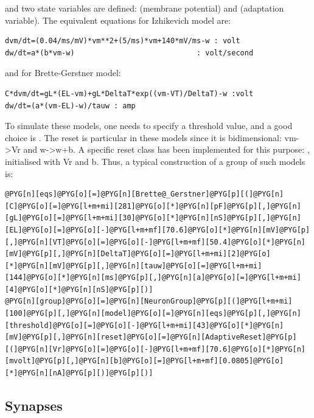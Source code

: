 \documentclass[letterpaper,10pt,english]{manual}
\begin{document}
and two state variables are defined:  (membrane potential) and  (adaptation variable).
The equivalent equations for Izhikevich model are:

\begin{Verbatim}[commandchars=@\[\]]
dvm/dt=(0.04/ms/mV)*vm**2+(5/ms)*vm+140*mV/ms-w : volt
dw/dt=a*(b*vm-w)                            : volt/second
\end{Verbatim}

and for Brette-Gerstner model:

\begin{Verbatim}[commandchars=@\[\]]
C*dvm/dt=gL*(EL-vm)+gL*DeltaT*exp((vm-VT)/DeltaT)-w :volt
dw/dt=(a*(vm-EL)-w)/tauw : amp
\end{Verbatim}

To simulate these models, one needs to specify a threshold value, and a good choice is
. The reset is particular in these models since it is bidimensional:
vm-\textgreater{}Vr and w-\textgreater{}w+b. A specific reset class has been implemented for this purpose:
, initialised with Vr and b. Thus, a typical construction of a group of
such models is:

\begin{Verbatim}[commandchars=@\[\]]
@PYG[n][eqs]@PYG[o][=]@PYG[n][Brette@_Gerstner]@PYG[p][(]@PYG[n][C]@PYG[o][=]@PYG[l+m+mi][281]@PYG[o][*]@PYG[n][pF]@PYG[p][,]@PYG[n][gL]@PYG[o][=]@PYG[l+m+mi][30]@PYG[o][*]@PYG[n][nS]@PYG[p][,]@PYG[n][EL]@PYG[o][=]@PYG[o][-]@PYG[l+m+mf][70.6]@PYG[o][*]@PYG[n][mV]@PYG[p][,]@PYG[n][VT]@PYG[o][=]@PYG[o][-]@PYG[l+m+mf][50.4]@PYG[o][*]@PYG[n][mV]@PYG[p][,]@PYG[n][DeltaT]@PYG[o][=]@PYG[l+m+mi][2]@PYG[o][*]@PYG[n][mV]@PYG[p][,]@PYG[n][tauw]@PYG[o][=]@PYG[l+m+mi][144]@PYG[o][*]@PYG[n][ms]@PYG[p][,]@PYG[n][a]@PYG[o][=]@PYG[l+m+mi][4]@PYG[o][*]@PYG[n][nS]@PYG[p][)]
@PYG[n][group]@PYG[o][=]@PYG[n][NeuronGroup]@PYG[p][(]@PYG[l+m+mi][100]@PYG[p][,]@PYG[n][model]@PYG[o][=]@PYG[n][eqs]@PYG[p][,]@PYG[n][threshold]@PYG[o][=]@PYG[o][-]@PYG[l+m+mi][43]@PYG[o][*]@PYG[n][mV]@PYG[p][,]@PYG[n][reset]@PYG[o][=]@PYG[n][AdaptiveReset]@PYG[p][(]@PYG[n][Vr]@PYG[o][=]@PYG[o][-]@PYG[l+m+mf][70.6]@PYG[o][*]@PYG[n][mvolt]@PYG[p][,]@PYG[n][b]@PYG[o][=]@PYG[l+m+mf][0.0805]@PYG[o][*]@PYG[n][nA]@PYG[p][)]@PYG[p][)]
\end{Verbatim}


\subsection{Synapses}
\end{document}
